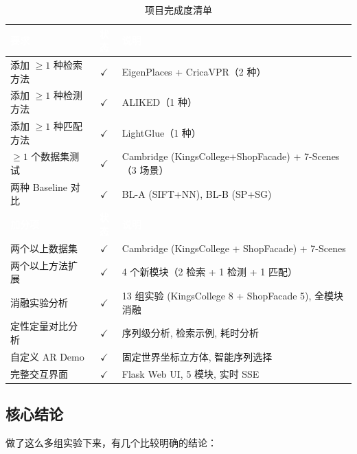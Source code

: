 \documentclass[12pt,a4paper]{ctexart}
\begin{document}
\begin{table}[H]
\centering
\caption{项目完成度清单}
\label{tab:checklist}
\begin{tabularx}{\textwidth}{@{}p{4.5cm}cX@{}}
\toprule
\rowcolor{headbg}
\textcolor{white}{\textbf{要求}} &
\textcolor{white}{\textbf{状态}} &
\textcolor{white}{\textbf{说明}} \\
\midrule
添加 $\ge 1$ 种检索方法 & $\checkmark$ & EigenPlaces + CricaVPR（2 种） \\
添加 $\ge 1$ 种检测方法 & $\checkmark$ & ALIKED（1 种） \\
添加 $\ge 1$ 种匹配方法 & $\checkmark$ & LightGlue（1 种） \\
$\ge 1$ 个数据集测试 & $\checkmark$ & Cambridge (KingsCollege+ShopFacade) + 7-Scenes（3 场景） \\
两种 Baseline 对比 & $\checkmark$ & BL-A (SIFT+NN), BL-B (SP+SG) \\
\bottomrule
\rowcolor{headbg}
\textcolor{white}{\textbf{加分项}} &
\textcolor{white}{\textbf{状态}} &
\textcolor{white}{\textbf{说明}} \\
\midrule
两个以上数据集 & $\checkmark$ & Cambridge (KingsCollege + ShopFacade) + 7-Scenes \\
两个以上方法扩展 & $\checkmark$ & 4 个新模块（2 检索 + 1 检测 + 1 匹配） \\
消融实验分析 & $\checkmark$ & 13 组实验 (KingsCollege 8 + ShopFacade 5), 全模块消融 \\
定性定量对比分析 & $\checkmark$ & 序列级分析, 检索示例, 耗时分析 \\
自定义 AR Demo & $\checkmark$ & 固定世界坐标立方体, 智能序列选择 \\
完整交互界面 & $\checkmark$ & Flask Web UI, 5 模块, 实时 SSE \\
\bottomrule
\end{tabularx}
\end{table}

\subsection{核心结论}

做了这么多组实验下来，有几个比较明确的结论：
\end{document}
